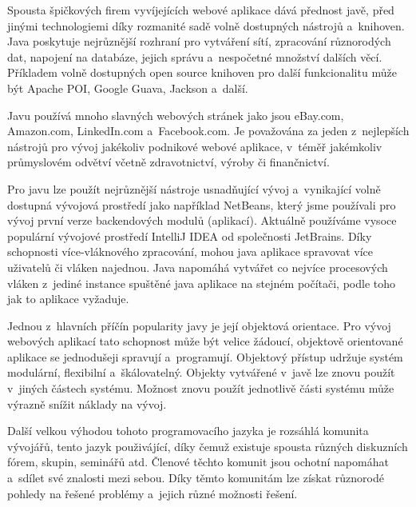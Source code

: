 \documentclass[12pt]{article}
\begin{document}
Spousta špičkových firem vyvíjejících webové aplikace dává přednost javě, 
před jinými technologiemi díky rozmanité sadě volně dostupných nástrojů a~knihoven.
Java poskytuje nejrůznější rozhraní pro vytváření sítí, zpracování různorodých dat,
napojení na databáze, jejich správu a~nespočetné množství dalších věcí.
Příkladem volně dostupných open source knihoven pro další funkcionalitu může být
Apache POI, Google Guava, Jackson a~další.

Javu používá mnoho slavných webových stránek jako jsou
eBay.com, Amazon.com, LinkedIn.com a~Facebook.com. 
Je považována za jeden z~nejlepších nástrojů
pro vývoj jakékoliv podnikové webové aplikace, v~téměř
jakémkoliv průmyslovém odvětví včetně zdravotnictví, výroby či finančnictví.

Pro javu lze použít nejrůznější nástroje usnadňující vývoj a~vynikající volně dostupná vývojová prostředí
jako například NetBeans, který jsme používali pro vývoj první verze backendových modulů 
(aplikací).
Aktuálně používáme vysoce populární vývojové prostředí IntelliJ IDEA
od společnosti JetBrains.
Díky schopnosti více-vláknového zpracování,
mohou java aplikace spravovat více uživatelů či vláken najednou.
Java napomáhá vytvářet co nejvíce procesových vláken z~jediné instance
spuštěné java aplikace na stejném počítači, podle toho jak to aplikace vyžaduje.


Jednou z~hlavních příčín popularity javy je její objektová orientace.
Pro vývoj webových aplikací tato schopnost může být velice žádoucí,
objektově orientované aplikace se jednodušeji spravují a~programují.
Objektový přístup udržuje systém modulární, flexibilní a~škálovatelný.
Objekty vytvářené v~javě lze znovu použít v~jiných částech systému.
Možnost znovu použít jednotlivě části systému může výrazně snížit náklady na vývoj.

Další velkou výhodou tohoto programovacího jazyka je rozsáhlá komunita vývojářů,
tento jazyk použivájící, díky čemuž existuje spousta různých diskuzních fórem,
skupin, seminářů atd. Členové těchto komunit
jsou ochotní napomáhat a~sdílet své znalosti mezi sebou.
Díky těmto komunitám lze získat různorodé pohledy na řešené problémy
a~jejich různé možnosti řešení.

\end{document}
